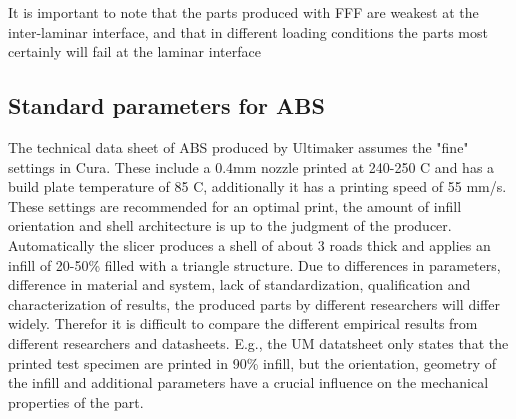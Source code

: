 It is important to note that the parts produced with FFF are weakest at the inter-laminar interface, and that in different loading conditions the parts most certainly will fail at the laminar interface \cite{Hart2018IncreasedAnnealing} \cite{Popescu2018FDMReview}

\subsection{Standard parameters for ABS}
    \label{standard parameters for ABS}
The technical data sheet of ABS produced by Ultimaker \cite{TechnicalUM} assumes the "fine" settings in Cura. These include a 0.4mm nozzle printed at 240-250 C and has a build plate temperature of 85 C, additionally it has a printing speed of 55 mm/s. These settings are recommended for an optimal print, the amount of infill orientation and shell architecture is up to the judgment of the producer. Automatically the slicer produces a shell of about 3 roads thick and applies an infill of 20-50\% filled with a triangle structure. Due to differences in parameters, difference in material and system, lack of standardization, qualification and characterization of results, the produced parts by different researchers will differ widely. Therefor it is difficult to compare the different empirical results from different researchers and datasheets. E.g., the UM datatsheet only states that the printed test specimen are printed in 90\% infill, but the orientation, geometry of the infill and additional parameters have a crucial influence on the mechanical properties of the part. 

